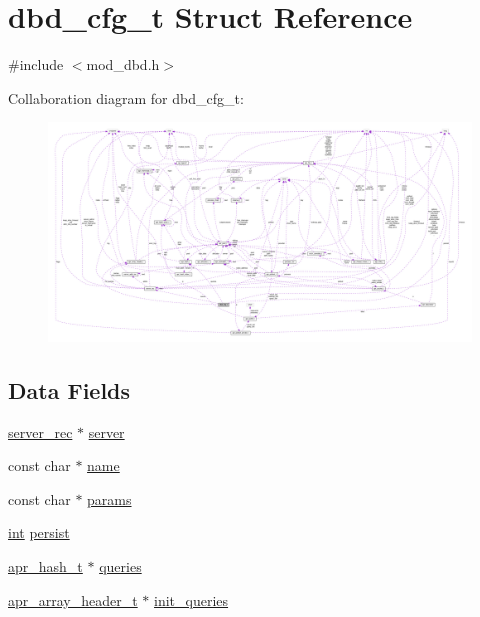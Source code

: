 \hypertarget{structdbd__cfg__t}{}\section{dbd\+\_\+cfg\+\_\+t Struct Reference}
\label{structdbd__cfg__t}


{\ttfamily \#include $<$mod\+\_\+dbd.\+h$>$}



Collaboration diagram for dbd\+\_\+cfg\+\_\+t\+:
\nopagebreak
\begin{figure}[H]
\begin{center}
\leavevmode
\includegraphics[width=350pt]{structdbd__cfg__t__coll__graph}
\end{center}
\end{figure}
\subsection*{Data Fields}
\begin{DoxyCompactItemize}
\item 
\hyperlink{structserver__rec}{server\+\_\+rec} $\ast$ \hyperlink{structdbd__cfg__t_a91d108e66ffcd225c9bcca560780736e}{server}
\item 
const char $\ast$ \hyperlink{structdbd__cfg__t_a106bf99c449aec70ec565244b26054e0}{name}
\item 
const char $\ast$ \hyperlink{structdbd__cfg__t_ad6f1389a671c42dd6717728349e91531}{params}
\item 
\hyperlink{pcre_8txt_a42dfa4ff673c82d8efe7144098fbc198}{int} \hyperlink{structdbd__cfg__t_a0a2f96bdf10998f3b5c3dbf9c2101df9}{persist}
\item 
\hyperlink{structapr__hash__t}{apr\+\_\+hash\+\_\+t} $\ast$ \hyperlink{structdbd__cfg__t_a8058057d3bf0c7690a45333ebb60e238}{queries}
\item 
\hyperlink{structapr__array__header__t}{apr\+\_\+array\+\_\+header\+\_\+t} $\ast$ \hyperlink{structdbd__cfg__t_ae4c78d2877c9f6463a9af28f17727014}{init\+\_\+queries}
\end{DoxyCompactItemize}


